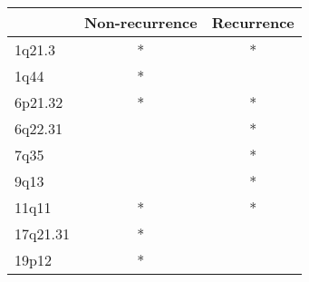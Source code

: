 \begin{tabular}{lcc}
\toprule
{} & Non-recurrence & Recurrence \\
\midrule
1q21.3   &              * &          * \\
1q44     &              * &            \\
6p21.32  &              * &          * \\
6q22.31  &                &          * \\
7q35     &                &          * \\
9q13     &                &          * \\
11q11    &              * &          * \\
17q21.31 &              * &            \\
19p12    &              * &            \\
\bottomrule
\end{tabular}
